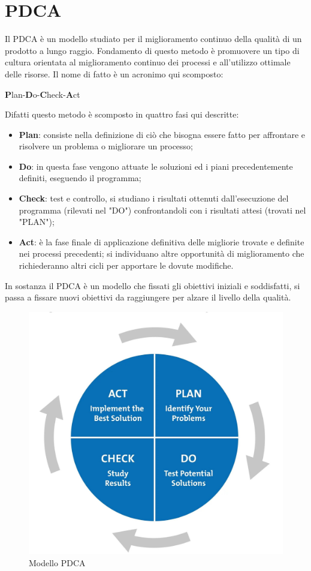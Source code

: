 \section{PDCA}
\label{pdca}
Il PDCA è un modello studiato per il miglioramento continuo della qualità di un prodotto a lungo raggio. Fondamento di questo metodo è promuovere un tipo di cultura orientata al miglioramento continuo dei processi e all'utilizzo ottimale delle risorse. Il nome di fatto è un acronimo qui scomposto:
\begin{center}
	\item \textbf{P}lan-\textbf{D}o-\textbf{C}heck-\textbf{A}ct
\end{center}
Difatti questo metodo è scomposto in quattro fasi qui descritte:
\begin{itemize}
	\item \textbf{Plan}: consiste nella definizione di ciò che bisogna essere fatto per affrontare e risolvere un problema o migliorare un processo;
	\item \textbf{Do}: in questa fase vengono attuate le soluzioni ed i piani precedentemente definiti, eseguendo il programma;
	\item \textbf{Check}: test e controllo, si studiano i risultati ottenuti dall'esecuzione del programma (rilevati nel "DO") confrontandoli con i risultati attesi (trovati nel "PLAN"); 
	\item \textbf{Act}: è la fase finale di applicazione definitiva delle migliorie trovate e definite nei processi precedenti; si individuano altre opportunità di miglioramento che richiederanno altri cicli per apportare le dovute modifiche.
\end{itemize}
In sostanza il PDCA è un modello che fissati gli obiettivi iniziali e soddisfatti, si passa a fissare nuovi obiettivi da raggiungere per alzare il livello della qualità.

\begin{figure}[H]
\centering
	\includegraphics[width=0.4\linewidth]{./images/pdca.jpg}
	\caption{Modello PDCA}
	\label{pdca}
\end{figure} 

 